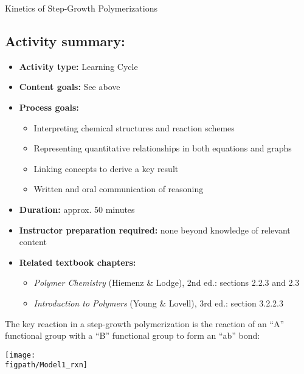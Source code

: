 \begin{activity}{Kinetics of Step-Growth Polymerizations}
\begin{instructornotes}
	\subsection*{Activity summary:}
	\begin{itemize}
		\item \textbf{Activity type:} Learning Cycle
		\item \textbf{Content goals:} See above
		\item \textbf{Process goals:} %
			\begin{itemize}
				\item Interpreting chemical structures and reaction schemes
				\item Representing quantitative relationships in both equations and graphs
				\item Linking concepts to derive a key result
				\item Written and oral communication of reasoning
			\end{itemize}
		\item \textbf{Duration:} approx. 50 minutes
		\item \textbf{Instructor preparation required:} none beyond knowledge of relevant content
		\item \textbf{Related textbook chapters:}
			\begin{itemize}
				\item \emph{Polymer Chemistry} (Hiemenz \& Lodge), 2nd ed.: sections 2.2.3 and 2.3
				\item \emph{Introduction to Polymers} (Young \& Lovell), 3rd ed.: section 3.2.2.3
			\end{itemize}
	\end{itemize}

\end{instructornotes}


\begin{model}
\label{\labelbase:mdl:simple}

	The key reaction in a step-growth polymerization is the reaction of an ``A'' functional group with a ``B'' functional group to form an ``ab'' bond:
	
	\centerline{\texttt{[image: \\figpath/Model1\_rxn]}}
	

\end{model}
\end{activity}
